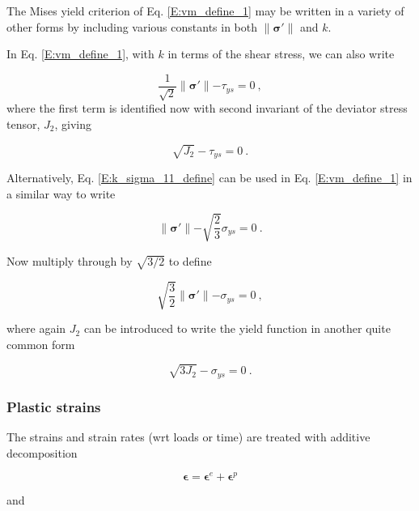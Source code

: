 \documentclass[11pt]{report}
\numberwithin{equation}{section}
\newcommand{\bmf } {\boldsymbol }
\begin{document}
The Mises yield criterion of Eq. \eqref{E:vm_define_1} may be written in
a variety of other forms by including various constants in both 
$\parallel \bmf \sigma' \parallel$ and $k$.

In Eq. \eqref{E:vm_define_1}, with $k$ in terms of the shear stress,
we can also write

\begin{equation}
\frac{1}{\sqrt{2}} \parallel \bmf \sigma' \parallel -\tau_{ys} = 0~,
\end{equation}
\noindent where the first term is identified now with second
invariant of the deviator stress tensor, $J_2$, giving

\begin{equation}
\sqrt{J_2} - \tau_{ys} = 0~.
\end{equation}

Alternatively, Eq. \eqref{E:k_sigma_11_define} can be used in Eq. \eqref{E:vm_define_1}
in a similar way to write

\begin{equation}
\parallel \bmf \sigma' \parallel - \sqrt{\textstyle{\frac{2}{3}}} \sigma_{ys}= 0~.
\end{equation}

\noindent Now multiply through by $\sqrt{3/2}$ to define

\begin{equation}
\sqrt{\textstyle{\frac{3}{2}}}\parallel \bmf \sigma' \parallel -  \sigma_{ys}= 0~,
\end{equation}

\noindent where again $J_2$ can be introduced to write the yield function in
another quite common form

\begin{equation}
\sqrt{3 J_2} -  \sigma_{ys}= 0~.
\end{equation}

\subsubsection{Plastic strains}
The strains and strain rates (wrt loads or time) are treated with additive decomposition

\begin{equation}
\bmf \epsilon = \bmf \epsilon^e + \bmf \epsilon^p
\end {equation}

\noindent and
\end{document}
